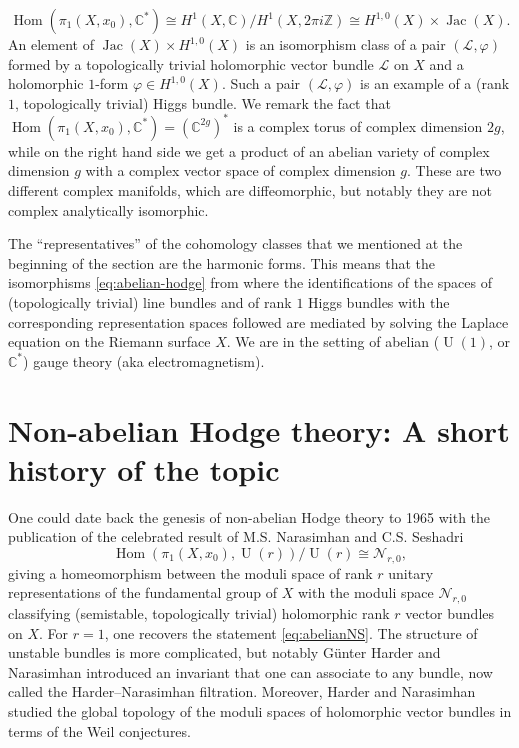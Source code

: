 \documentclass[12pt,a4paper]{amsbook}
\theoremstyle{remark} \newtheorem{rmk}[thm]{Remark}
\theoremstyle{definition} \newtheorem{defn}[thm]{Definition}
\theoremstyle{definition} \newtheorem{ex}[thm]{Example}
\theoremstyle{definition} \newtheorem{ej}{Exercise}
\newcommand{\C}{\mathbb C}
\newcommand{\Z}{\mathbb Z}
\newcommand{\cN}{\mathcal N}
\newcommand{\sL}{\mathscr L}
\DeclareMathOperator{\Hom}{Hom}
\DeclareMathOperator{\Jac}{Jac}
\DeclareMathOperator{\U}{U}
\begin{document}
\begin{equation*}
\Hom(\pi_1(X,x_0),\C^*) \cong H^1(X,\C)/H^1(X,2\pi i \Z) \cong H^{1,0}(X) \times \Jac(X).
\end{equation*}
An element of $\Jac(X) \times H^{1,0}(X)$ is an isomorphism class of a pair $(\sL,\varphi)$ formed by a topologically trivial holomorphic vector bundle $\sL$ on $X$ and a holomorphic $1$-form $\varphi \in H^{1,0}(X)$. Such a pair $(\sL,\varphi)$ is an example of a (rank $1$, topologically trivial) Higgs bundle. We remark the fact that $\Hom(\pi_1(X,x_0),\C^*)=(\C^{2g})^*$ is a complex torus of complex dimension $2g$, while on the right hand side we get a product of an abelian variety of complex dimension $g$ with a complex vector space of complex dimension $g$. These are two different complex manifolds, which are diffeomorphic, but notably they are not complex analytically isomorphic.

The ``representatives'' of the cohomology classes that we mentioned at the beginning of the section are the harmonic forms. This means that the isomorphisms \eqref{eq:abelian-hodge} from where the identifications of the spaces of (topologically trivial) line bundles and of rank $1$ Higgs bundles with the corresponding representation spaces followed are mediated by solving the Laplace equation on the Riemann surface $X$. We are in the setting of abelian ($\U(1)$, or $\C^*$) gauge theory (aka electromagnetism).

\section{Non-abelian Hodge theory: A short history of the topic}
One could date back the genesis of non-abelian Hodge theory to 1965 with the publication of the celebrated result of M.S. Narasimhan and C.S. Seshadri \cite{NarasimhanSeshadri}
\begin{equation*}
\Hom(\pi_1(X,x_0),\U(r))/\U(r) \cong \cN_{r,0} ,
\end{equation*}
giving a homeomorphism between the moduli space of rank $r$ unitary representations of the fundamental group of $X$ with the moduli space $\cN_{r,0}$ classifying (semistable, topologically trivial) holomorphic rank $r$ vector bundles on $X$. For $r=1$, one recovers the statement \eqref{eq:abelianNS}. The structure of unstable bundles is more complicated, but notably Günter Harder and Narasimhan \cite{HarderNarasimhan} introduced an invariant that one can associate to any bundle, now called the Harder--Narasimhan filtration. Moreover, Harder and Narasimhan studied the global topology of the moduli spaces of holomorphic vector bundles in terms of the Weil conjectures.
\end{document}
